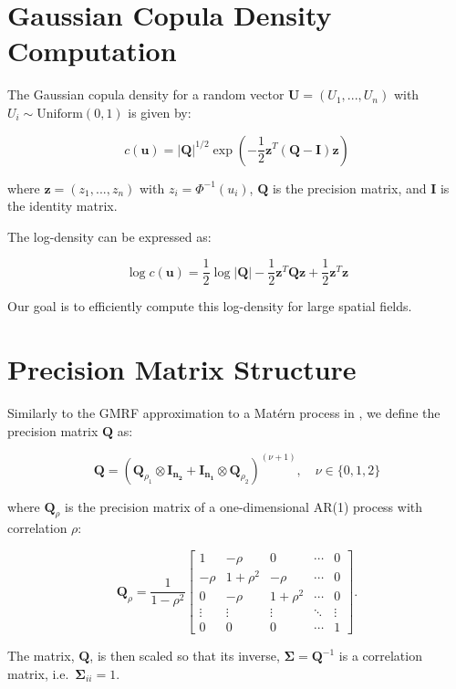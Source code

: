 \documentclass[
  12pt]{article}
\begin{document}
\section{Gaussian Copula Density
Computation}\label{gaussian-copula-density-computation}

The Gaussian copula density for a random vector
\(\mathbf{U} = (U_1, ..., U_n)\) with \(U_i \sim \text{Uniform}(0,1)\)
is given by:

\[
c(\mathbf{u}) = |\mathbf{Q}|^{1/2} \exp\left(-\frac{1}{2}\mathbf{z}^T(\mathbf{Q} - \mathbf{I})\mathbf{z}\right)
\]

where \(\mathbf{z} = (z_1, ..., z_n)\) with \(z_i = \Phi^{-1}(u_i)\),
\(\mathbf{Q}\) is the precision matrix, and \(\mathbf{I}\) is the
identity matrix.

The log-density can be expressed as:

\[
\log c(\mathbf{u}) = \frac{1}{2}\log|\mathbf{Q}| - \frac{1}{2}\mathbf{z}^T\mathbf{Q}\mathbf{z} + \frac{1}{2}\mathbf{z}^T\mathbf{z}
\]

Our goal is to efficiently compute this log-density for large spatial
fields.

\section{Precision Matrix Structure}\label{precision-matrix-structure}

Similarly to the GMRF approximation to a Matérn process in
\citep{lindgren2011}, we define the precision matrix \(\mathbf{Q}\) as:

\[
\mathbf{Q} = (\mathbf{Q}_{\rho_1} \otimes \mathbf{I_{n_2}} + \mathbf{I_{n_1}} \otimes \mathbf{Q}_{\rho_2})^{(\nu + 1)}, \quad \nu \in \{0, 1, 2\}
\]

where \(\mathbf{Q}_\rho\) is the precision matrix of a one-dimensional
AR(1) process with correlation \(\rho\):

\[
\mathbf{Q}_\rho = \frac{1}{1-\rho^2}
\begin{bmatrix}
1 & -\rho & 0 & \cdots & 0 \\
-\rho & 1+\rho^2 & -\rho & \cdots & 0 \\
0 & -\rho & 1+\rho^2 & \cdots & 0 \\
\vdots & \vdots & \vdots & \ddots & \vdots \\
0 & 0 & 0 & \cdots & 1
\end{bmatrix}.
\]

The matrix, \(\mathbf Q\), is then scaled so that its inverse,
\(\mathbf \Sigma = \mathbf Q^{-1}\) is a correlation matrix,
i.e.~\(\mathbf \Sigma_{ii} = 1\).
\end{document}
